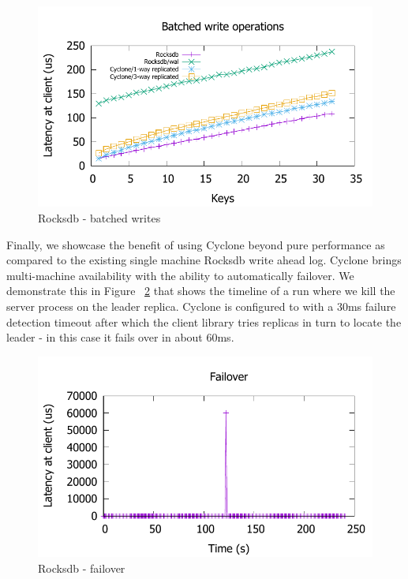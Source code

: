 \documentclass[10pt, preprint, nonatbib]{sigplanconf}
\begin{document}
\begin{figure}
\includegraphics[scale=0.6]{results2/rocksdb_multi.pdf}
\caption{Rocksdb - batched writes}
\label{fig:rocksdb_multi}
\end{figure}

Finally, we showcase the benefit of using Cyclone beyond pure performance as
compared to the existing single machine Rocksdb write ahead log. Cyclone brings
multi-machine availability with the ability to automatically failover. We
demonstrate this in Figure ~\ref{fig:timeline} that shows the timeline of a run
where we kill the server process on the leader replica. Cyclone is configured to
with a 30ms failure detection timeout after which the client library tries
replicas in turn to locate the leader - in this case it fails over in about
60ms.

\begin{figure}
\includegraphics[scale=0.6]{results2/failover.pdf}
\caption{Rocksdb - failover}
\label{fig:timeline}
\end{figure}
\end{document}
